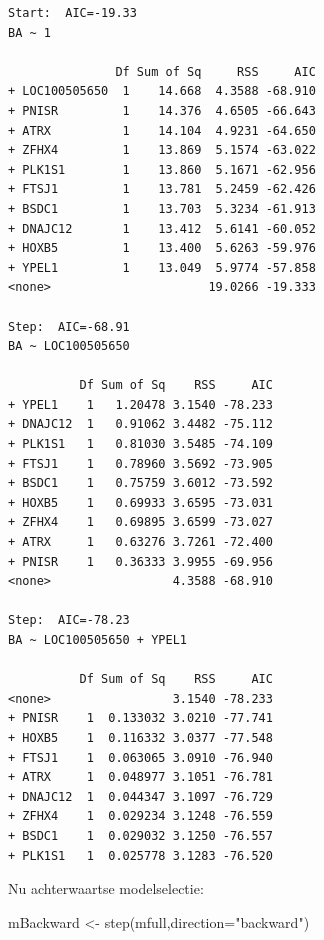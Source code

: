 \documentclass[
  dutch,
  letterpaper,
  12pt]{book}
\newenvironment{Shaded}{\begin{snugshade}}{\end{snugshade}}
\newcommand{\AttributeTok}[1]{\textcolor[rgb]{0.40,0.45,0.13}{#1}}
\newcommand{\FunctionTok}[1]{\textcolor[rgb]{0.28,0.35,0.67}{#1}}
\newcommand{\NormalTok}[1]{\textcolor[rgb]{0.00,0.23,0.31}{#1}}
\newcommand{\OtherTok}[1]{\textcolor[rgb]{0.00,0.23,0.31}{#1}}
\newcommand{\StringTok}[1]{\textcolor[rgb]{0.13,0.47,0.30}{#1}}
\newcounter{none} %
\theoremstyle{definition}
\theoremstyle{definition}
\theoremstyle{definition}
\theoremstyle{remark}
\begin{document}
\begin{verbatim}
Start:  AIC=-19.33
BA ~ 1

               Df Sum of Sq     RSS     AIC
+ LOC100505650  1    14.668  4.3588 -68.910
+ PNISR         1    14.376  4.6505 -66.643
+ ATRX          1    14.104  4.9231 -64.650
+ ZFHX4         1    13.869  5.1574 -63.022
+ PLK1S1        1    13.860  5.1671 -62.956
+ FTSJ1         1    13.781  5.2459 -62.426
+ BSDC1         1    13.703  5.3234 -61.913
+ DNAJC12       1    13.412  5.6141 -60.052
+ HOXB5         1    13.400  5.6263 -59.976
+ YPEL1         1    13.049  5.9774 -57.858
<none>                      19.0266 -19.333

Step:  AIC=-68.91
BA ~ LOC100505650

          Df Sum of Sq    RSS     AIC
+ YPEL1    1   1.20478 3.1540 -78.233
+ DNAJC12  1   0.91062 3.4482 -75.112
+ PLK1S1   1   0.81030 3.5485 -74.109
+ FTSJ1    1   0.78960 3.5692 -73.905
+ BSDC1    1   0.75759 3.6012 -73.592
+ HOXB5    1   0.69933 3.6595 -73.031
+ ZFHX4    1   0.69895 3.6599 -73.027
+ ATRX     1   0.63276 3.7261 -72.400
+ PNISR    1   0.36333 3.9955 -69.956
<none>                 4.3588 -68.910

Step:  AIC=-78.23
BA ~ LOC100505650 + YPEL1

          Df Sum of Sq    RSS     AIC
<none>                 3.1540 -78.233
+ PNISR    1  0.133032 3.0210 -77.741
+ HOXB5    1  0.116332 3.0377 -77.548
+ FTSJ1    1  0.063065 3.0910 -76.940
+ ATRX     1  0.048977 3.1051 -76.781
+ DNAJC12  1  0.044347 3.1097 -76.729
+ ZFHX4    1  0.029234 3.1248 -76.559
+ BSDC1    1  0.029032 3.1250 -76.557
+ PLK1S1   1  0.025778 3.1283 -76.520
\end{verbatim}

Nu achterwaartse modelselectie:

\begin{Shaded}
\begin{Highlighting}[]
\NormalTok{mBackward }\OtherTok{\textless{}{-}} \FunctionTok{step}\NormalTok{(mfull,}\AttributeTok{direction=}\StringTok{"backward"}\NormalTok{)}
\end{Highlighting}
\end{Shaded}
\end{document}
